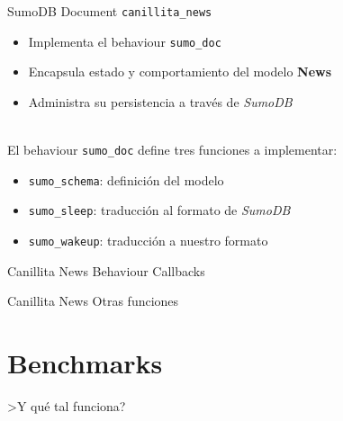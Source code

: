 \documentclass[utf8,hyperref={colorlinks=true}]{beamer}
\begin{document}
\begin{frame}{SumoDB Document}
\alert{\texttt{canillita\_news}}
\begin{itemize}
	\item Implementa el behaviour \texttt{sumo\_doc}
	\item Encapsula estado y comportamiento del modelo \textbf{News}
	\item Administra su persistencia a trav\'es de \emph{SumoDB}
\end{itemize}
\pause
~\\
El behaviour \texttt{sumo\_doc} define tres funciones a implementar:
\begin{itemize}
	\item\texttt{sumo\_schema}: definici\'on del modelo
	\item\texttt{sumo\_sleep}: traducci\'on al formato de \emph{SumoDB}
	\item\texttt{sumo\_wakeup}: traducci\'on a nuestro formato
\end{itemize}
\end{frame}

\begin{frame}{Canillita News}
{Behaviour Callbacks}
\canillitanews
\end{frame}

\begin{frame}[t]{Canillita News}
{Otras funciones}
\end{frame}

\section{Benchmarks}
\begin{frame}
\center\Huge >Y qu\'e tal funciona?
\end{frame}
\end{document}
